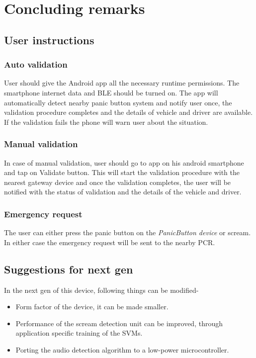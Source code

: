 
\chapter{Concluding remarks}



\section{User instructions}
\subsection{Auto validation}
User should give the Android app all the necessary runtime permissions. The smartphone internet data and BLE should be turned on. The app will automatically detect nearby panic button system and notify user once, the validation procedure completes and the details of vehicle and driver are available. If the validation fails the phone will warn user about the situation.
\subsection{Manual validation}
In case of manual validation, user should go to app on his android smartphone and tap on Validate button. This will start the validation procedure with the nearest gateway device and once the validation completes, the user will be notified with the status of validation and the details of the vehicle and driver.
\subsection{Emergency request}
The user can either press the panic button on the \emph{PanicButton device} or scream. In either case the emergency request will be sent to the nearby PCR.





\section{Suggestions for next gen}
In the next gen of this device, following things can be modified-
\begin{itemize}
\item Form factor of the device, it can be made smaller.
\item Performance of the scream detection unit can be improved, through application specific training of the SVMs.
\item Porting the audio detection algorithm to a low-power microcontroller.
\end{itemize}



